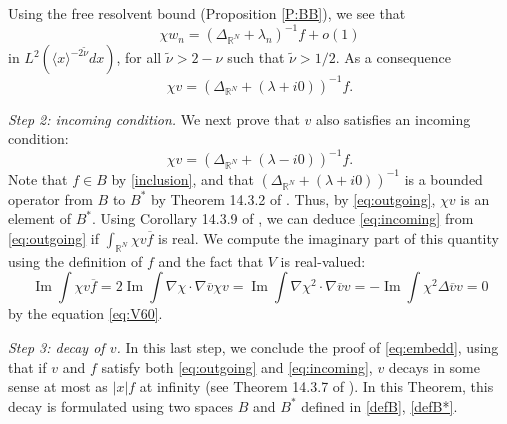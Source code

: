 \documentclass[10pt,leqno]{amsart}
\DeclareMathOperator{\im}{Im} %
\theoremstyle{definition}%
\theoremstyle{remark}
\numberwithin{equation}{section}
\newcommand{\R}{\mathbb{R}}
\renewcommand{\^}{\widehat}%
\begin{document}
Using the free resolvent bound (Proposition \ref{P:BB}), we see that 
$$\chi w_n=\left( \Delta_{\R^N}+\lambda_n \right)^{-1} f+o(1)$$
in $L^2\left( \langle x\rangle^{-2\tilde{\nu}}dx \right)$, for all $\tilde{\nu}>2-\nu$ such that $\tilde{\nu}>1/2$. As a consequence  
\begin{equation}
\label{eq:outgoing}
\chi v=\left(\Delta_{\R^N}+(\lambda+i0) \right)^{-1}f.
\end{equation}

\smallskip

\noindent\emph{Step 2: incoming condition.}
We next prove that $v$ also satisfies an incoming condition: 
\begin{equation}
\label{eq:incoming}
\chi v=\left( \Delta_{\R^N}+(\lambda-i0) \right)^{-1}f.
\end{equation}
Note that $f\in B$ by \eqref{inclusion}, and that $\left(\Delta_{\R^N}+(\lambda+i0) \right)^{-1}$ is a bounded operator from $B$ to $B^*$ by Theorem 14.3.2 of \cite{Hormander.T2}. Thus, by \eqref{eq:outgoing}, $\chi v$ is an element of $B^*$. Using Corollary 14.3.9 of \cite{Hormander.T2}, we can deduce \eqref{eq:incoming} from \eqref{eq:outgoing} if $\int_{\R^N} \chi v \overline{f}$ is real. We compute the imaginary part of this quantity using the definition of $f$ and the fact that $V$ is real-valued:
\begin{equation*}
 \im\int\chi v \overline{f}=2\im \int\nabla \chi \cdot\nabla \overline{v} \chi v=\im \int \nabla \chi^2\cdot\nabla \overline{v} v=-\im\int \chi^2\Delta \overline{v} v=0
\end{equation*}
by the equation \eqref{eq:V60}.

\smallskip

\noindent\emph{Step 3: decay of $v$.}
In this last step, we conclude the proof of \eqref{eq:embedd}, using that if $v$ and $f$ satisfy both \eqref{eq:outgoing} and \eqref{eq:incoming}, $v$ decays in some sense at most as $|x|f$ at infinity (see Theorem 14.3.7 of \cite{Hormander.T2}). In this Theorem, this decay is formulated using two spaces $B$ and $B^*$  defined in \eqref{defB}, \eqref{defB*}.
\end{document}
